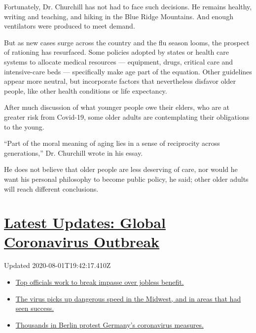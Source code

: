 Fortunately, Dr. Churchill has not had to face such decisions. He
remains healthy, writing and teaching, and hiking in the Blue Ridge
Mountains. And enough ventilators were produced to meet demand.

But as new cases surge across the country and the flu season looms, the
prospect of rationing has resurfaced. Some policies adopted by states or
health care systems to allocate medical resources --- equipment, drugs,
critical care and intensive-care beds --- specifically make age part of
the equation. Other guidelines appear more neutral, but incorporate
factors that nevertheless disfavor older people, like other health
conditions or life expectancy.

After much discussion of what younger people owe their elders, who are
at greater risk from Covid-19, some older adults are contemplating their
obligations to the young.

``Part of the moral meaning of aging lies in a sense of reciprocity
across generations,'' Dr. Churchill wrote in his essay.

He does not believe that older people are less deserving of care, nor
would he want his personal philosophy to become public policy, he said;
other older adults will reach different conclusions.

\hypertarget{latest-updates-global-coronavirus-outbreak}{%
\section{\texorpdfstring{\href{https://www.nytimes3xbfgragh.onion/2020/08/01/world/coronavirus-covid-19.html?action=click\&pgtype=Article\&state=default\&region=MAIN_CONTENT_1\&context=storylines_live_updates}{Latest
Updates: Global Coronavirus
Outbreak}}{Latest Updates: Global Coronavirus Outbreak}}\label{latest-updates-global-coronavirus-outbreak}}

Updated 2020-08-01T19:42:17.410Z

\begin{itemize}
\tightlist
\item
  \href{https://www.nytimes3xbfgragh.onion/2020/08/01/world/coronavirus-covid-19.html?action=click\&pgtype=Article\&state=default\&region=MAIN_CONTENT_1\&context=storylines_live_updates\#link-3ac56579}{Top
  officials work to break impasse over jobless benefit.}
\item
  \href{https://www.nytimes3xbfgragh.onion/2020/08/01/world/coronavirus-covid-19.html?action=click\&pgtype=Article\&state=default\&region=MAIN_CONTENT_1\&context=storylines_live_updates\#link-8796723}{The
  virus picks up dangerous speed in the Midwest, and in areas that had
  seen success.}
\item
  \href{https://www.nytimes3xbfgragh.onion/2020/08/01/world/coronavirus-covid-19.html?action=click\&pgtype=Article\&state=default\&region=MAIN_CONTENT_1\&context=storylines_live_updates\#link-25930521}{Thousands
  in Berlin protest Germany's coronavirus measures.}
\end{itemize}


